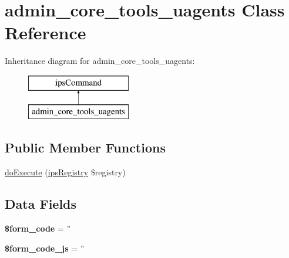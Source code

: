 \hypertarget{classadmin__core__tools__uagents}{\section{admin\-\_\-core\-\_\-tools\-\_\-uagents Class Reference}
\label{classadmin__core__tools__uagents}
}
Inheritance diagram for admin\-\_\-core\-\_\-tools\-\_\-uagents\-:\begin{figure}[H]
\begin{center}
\leavevmode
\includegraphics[height=2.000000cm]{classadmin__core__tools__uagents}
\end{center}
\end{figure}
\subsection*{Public Member Functions}
\begin{DoxyCompactItemize}
\item 
\hyperlink{classadmin__core__tools__uagents_afbc4e912a0604b94d47d66744c64d8ba}{do\-Execute} (\hyperlink{classips_registry}{ips\-Registry} \$registry)
\end{DoxyCompactItemize}
\subsection*{Data Fields}
\begin{DoxyCompactItemize}
\item 
\hypertarget{classadmin__core__tools__uagents_af28aee726fa3eb6c355d08a2ab655e03}{{\bfseries \$form\-\_\-code} = ''}\label{classadmin__core__tools__uagents_af28aee726fa3eb6c355d08a2ab655e03}

\item 
\hypertarget{classadmin__core__tools__uagents_ac68fe8a02a2efd63c3271179f4b4fbb7}{{\bfseries \$form\-\_\-code\-\_\-js} = ''}\label{classadmin__core__tools__uagents_ac68fe8a02a2efd63c3271179f4b4fbb7}

\end{DoxyCompactItemize}
